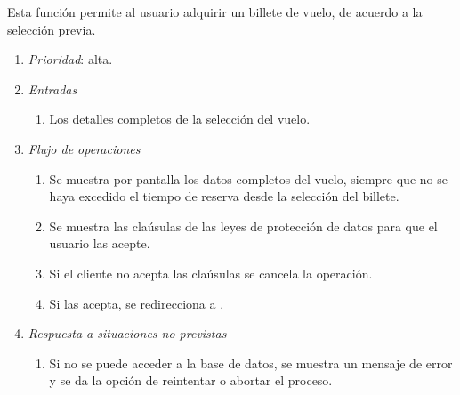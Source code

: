 

 \label{fun:iniciarpago}
	Esta función permite al usuario adquirir un billete de vuelo, de acuerdo a la selección previa.

	\begin{enumerate}
		\item \textit{Prioridad}: alta.
		\item \textit{Entradas}
		\begin{enumerate}
			\item Los detalles completos de la selección del vuelo.
		\end{enumerate}
		\item \textit{Flujo de operaciones}
		\begin{enumerate}
			\item Se muestra por pantalla los datos completos del vuelo, siempre que no se haya excedido el tiempo de reserva desde la selección del billete.
			\item Se muestra las claúsulas de las leyes de protección de datos para que el usuario las acepte.
			\item Si el cliente no acepta las claúsulas se cancela la operación.
			\item Si las acepta, se redirecciona a .
		\end{enumerate}
		\item \textit{Respuesta a situaciones no previstas}
		\begin{enumerate}
			\item Si no se puede acceder a la base de datos, se muestra un mensaje de error y se da la opción de reintentar o abortar el proceso.
		\end{enumerate}
	\end{enumerate}
